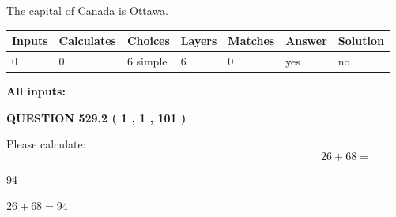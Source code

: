 \documentclass[12pt]{article}
\begin{document}
 
The capital of Canada is Ottawa.
 
 
\noindent{}
 
 
   
   
   
   
\noindent\begin{tabular}{|l|l|l|l|l|l|l|}
 \hline
Inputs & Calculates & Choices & Layers & Matches & Answer & Solution \\ \hline
 0  & 
 0  & 
 6
  simple  
  & 
 6  & 
 0  & 
  yes & 
  no 
  \\ \hline
 \end{tabular}
   
   
   
   
\noindent{}
   
   
   
   
\noindent\vspace{0.1in}\hspace{-0.08in} {\textbf{\Large{All inputs: }}}
   
   
  
\vspace{0.2in}
  
{\textbf{\Large{QUESTION
529.2 
 ( 1 , 1 , 101 )
}}}
  
  
 
Please calculate:
\begin{equation}
26 +  %
68 = \nonumber
\end{equation}
 
 
 
\noindent{}
 
 

94
 
 
\noindent{}
 
 

 
 
 
\noindent{}
 
 

$ %
26 +  %
68=   %
94$
 
 
\noindent{}
 
\end{document}
